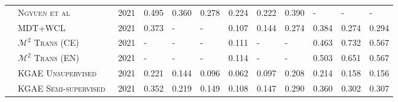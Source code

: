 \documentclass[10pt,journal,compsoc]{IEEEtran}
\begin{document}
\begin{table}
{\begin{tabular}{|c|l|l|llllll|lll|}
                                      & \textsc{Ngyuen et al~\cite{nguyen2021automated}}                                         & 2021                           & 0.495                    & 0.360                    & 0.278                    & 0.224                    & 0.222                   & 0.390                     & -                     & -                     & -                        \\
                                      & \textsc{MDT+WCL~\cite{yan2021weakly}}                                              & 2021                           & 0.373                    & -                        & -                        & 0.107                    & 0.144                   & 0.274                     & 0.384                 & 0.274                 & 0.294                    \\
                                      & \textsc{$\mathcal{M}^2$ Trans (CE)~\cite{miura2020improving}}                                        & 2021                           & -                        & -                        & -                        & 0.111                    & -                       & -                         & 0.463                 & 0.732                 & 0.567                    \\
                                      & \textsc{$\mathcal{M}^2$ Trans (EN)~\cite{miura2020improving} }                                       & 2021                           & -                        & -                        & -                        & 0.114                    & -                       & -                         & 0.503                 & 0.651                 & 0.567                    \\
                                            & \textsc{KGAE Unsupervised~\cite{liu2021auto}}                                    & 2021                           & 0.221                    & 0.144                    & 0.096                    & 0.062                    & 0.097                   & 0.208                    & 0.214                     & 0.158                     & 0.156                        \\ 
                                  & \textsc{KGAE Semi-supervised~\cite{liu2021auto}}                                    & 2021                           & 0.352                    & 0.219                    & 0.149                    & 0.108                    & 0.147                   & 0.290                     & 0.360                     & 0.302                     & 0.307                        \\ 

\end{tabular}}
\end{table}
\end{document}
